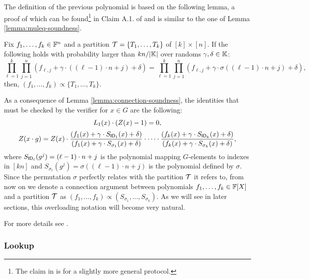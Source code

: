 The definition of the previous polynomial is based on the following lemma, a proof of which can be found\footnote{The claim in \cite{EPRINT:GabWilCio19} is for a slightly more general protocol.} in Claim A.1. of \cite{EPRINT:GabWilCio19} and is similar to the one of Lemma \ref{lemma:muleq-soundness}.
\begin{lemma}\label{lemma:connection-soundness}
Fix $f_1,\dots,f_k \in \mathbb{F}^n$ and a partition $\mathcal{T} = \{T_1,\dots,T_k\}$ of $[k] \times [n]$. If the following holds with probability larger than $kn/|\mathbb{K}|$ over randoms $\gamma, \delta \in \mathbb{K}$:
\[
\prod_{\ell=1}^k \prod_{j=1}^n (f_{\ell,j} + \gamma \cdot ((\ell-1)\cdot n + j) + \delta) = \prod_{\ell=1}^k \prod_{j=1}^n (f_{\ell,j} + \gamma \cdot \sigma((\ell-1)\cdot n + j) + \delta),
\]
then, $(f_1,\dots,f_k) \propto \{T_1,\dots,T_k\}$.
\end{lemma}

As a consequence of Lemma \ref{lemma:connection-soundness}, the identities that must be checked by the verifier for $x \in G$ are the following: 
\begin{align} \label{eq:connection-Z}
\begin{array}{c}
  L_1(x) \cdot (Z(x) - 1) = 0, \\[0.2cm]
  \displaystyle Z(x \cdot g)  = Z(x) \cdot \frac{(f_{1}(x) + \gamma \cdot S_{\textsf{ID}_1}(x) + \delta)}{(f_{1}(x) + \gamma \cdot S_{\sigma_1}(x) + \delta)} \cdot \cdots \cdot \frac{(f_{k}(x) + \gamma \cdot S_{\textsf{ID}_k}(x) + \delta)}{(f_{k}(x) + \gamma \cdot S_{\sigma_k}(x) + \delta)},
\end{array}
\end{align}
where $S_{\textsf{ID}_{\ell}}(g^j) = (\ell-1)\cdot n +j$ is the polynomial mapping $G$-elements to indexes in $[kn]$ and $S_{\sigma_{\ell}}(g^j) = \sigma((\ell-1)\cdot n +j)$ is the polynomial defined by $\sigma$. Since the permutation $\sigma$ perfectly relates with the partition $\mathcal{T}$ it refers to, from now on we denote a connection argument between polynomials $f_1,\dots,f_k \in \mathbb{F}[X]$ and a partition $\mathcal{T}$ as $(f_1,\dots,f_k) \propto (S_{\sigma_1},\dots,S_{\sigma_k})$. As we will see in later sections, this overloading notation will become very natural.

For more details see \cite{EPRINT:GabWilCio19}.


\subsubsection*{Lookup}


